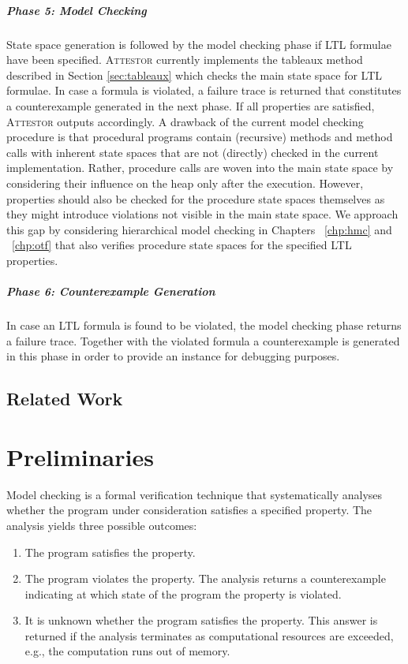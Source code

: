 \documentclass[a4paper, 12pt, twoside]{report}
\begin{document}
	
	\paragraph{Phase 5: Model Checking}
	State space generation is followed by the model checking phase if LTL formulae have been specified. \textsc{Attestor} currently implements the tableaux method described in Section \ref{sec:tableaux} which checks the main state space for LTL formulae. In case a formula is violated, a failure trace is returned that constitutes a counterexample generated in the next phase. If all properties are satisfied, \textsc{Attestor} outputs accordingly. A drawback of the current model checking procedure is that procedural programs contain (recursive) methods and method calls with inherent state spaces that are not (directly) checked in the current implementation. Rather, procedure calls are woven into the main state space by considering their influence on the heap only after the execution. However, properties should also be checked for the procedure state spaces themselves as they might introduce violations not visible in the main state space. We approach this gap by considering hierarchical model checking in Chapters ~\ref{chp:hmc} and ~\ref{chp:otf} that also verifies procedure state spaces for the specified LTL properties.
	
	\paragraph{Phase 6: Counterexample Generation}
	In case an LTL formula is found to be violated, the model checking phase returns a failure trace. Together with the violated formula a counterexample is generated in this phase in order to provide an instance for debugging purposes.

	\section{Related Work}
	
	\chapter{Preliminaries}
	
	Model checking is a formal verification technique that systematically analyses whether the program under consideration satisfies a specified property. The analysis yields three possible outcomes:
	\begin{enumerate}
		\item The program satisfies the property.
		\item The program violates the property. The analysis returns a counterexample indicating at which state of the program the property is violated. 		
		\item It is unknown whether the program satisfies the property. This answer is returned if the analysis terminates as computational resources are exceeded, e.g., the computation runs out of memory.
	\end{enumerate}  
\end{document}
